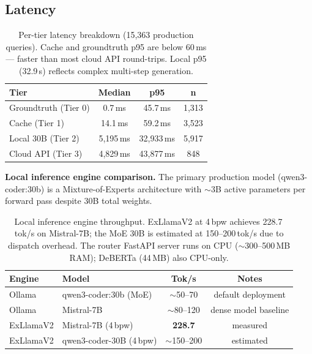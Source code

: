 \documentclass[11pt]{article}
\begin{document}
\subsection{Latency}

\begin{table}[t]
\centering
\small
\begin{tabular}{lccc}
\toprule
\textbf{Tier} & \textbf{Median} & \textbf{p95} & \textbf{n} \\
\midrule
Groundtruth (Tier 0) & 0.7\,ms & 45.7\,ms & 1,313 \\
Cache (Tier 1) & 14.1\,ms & 59.2\,ms & 3,523 \\
Local 30B (Tier 2) & 5,195\,ms & 32,933\,ms & 5,917 \\
Cloud API (Tier 3) & 4,829\,ms & 43,877\,ms & 848 \\
\bottomrule
\end{tabular}
\caption{Per-tier latency breakdown (15,363 production queries). Cache
and groundtruth p95 are below 60\,ms --- faster than most cloud API
round-trips. Local p95 (32.9\,s) reflects complex multi-step generation.}
\label{tab:latency}
\end{table}

\textbf{Local inference engine comparison.} The primary production
model (qwen3-coder:30b) is a Mixture-of-Experts architecture with
$\sim$3B active parameters per forward pass despite 30B total weights.

\begin{table}[t]
\centering
\small
\begin{tabular}{llcc}
\toprule
\textbf{Engine} & \textbf{Model} & \textbf{Tok/s} & \textbf{Notes} \\
\midrule
Ollama & qwen3-coder:30b (MoE) & $\sim$50--70 & default deployment \\
Ollama & Mistral-7B & $\sim$80--120 & dense model baseline \\
ExLlamaV2 & Mistral-7B (4\,bpw) & \textbf{228.7} & measured \\
ExLlamaV2 & qwen3-coder-30B (4\,bpw) & $\sim$150--200 & estimated \\
\bottomrule
\end{tabular}
\caption{Local inference engine throughput. ExLlamaV2 at 4\,bpw
achieves 228.7\,tok/s on Mistral-7B; the MoE 30B is estimated at
150--200\,tok/s due to dispatch overhead. The router FastAPI server
runs on CPU ($\sim$300--500\,MB RAM); DeBERTa (44\,MB) also CPU-only.}
\label{tab:engines}
\end{table}
\end{document}
